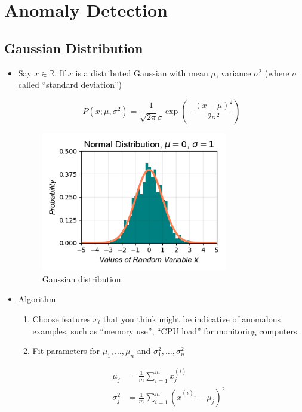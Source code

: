 \chapter{Anomaly Detection}


\section{Gaussian Distribution}
\begin{itemize}
    \item Say $x \in \mathbb{R}$. If $x$ is a distributed Gaussian with mean $\mu$, variance $\sigma^2$ 
    (where $\sigma$ called ``standard deviation'')

    \begin{equation}
        P(x;\mu,\sigma^2) = \frac{1}{\sqrt{2\pi}\sigma}\exp\left({-\frac{(x-\mu)^2}{2\sigma^2}}\right)
    \end{equation}
    
    \begin{figure}[!htbp]
        \centering
        \includegraphics[width=3.2in]{./images/gaussianDistribution.png}
        \caption{Gaussian distribution}
    \end{figure}

    \item Algorithm
    \begin{enumerate}
        \item Choose features $x_i$ that you think might be indicative of anomalous examples, 
        such as ``memory use'', ``CPU load'' for monitoring computers
        
        \item Fit parameters for $\mu_1,\dots,\mu_n$ and $\sigma_1^2,\dots,\sigma_n^2$
        
        \begin{equation}
            \begin{aligned}
                \mu_j      &= \frac{1}{m} \sum_{i=1}^{m}{x^{(i)}_j}\\
                \sigma_j^2 &= \frac{1}{m} \sum_{i=1}^{m}\left(x^{(i)_j} - \mu_j\right)^2
            \end{aligned}
        \end{equation}
        

\end{enumerate}
\end{itemize}
